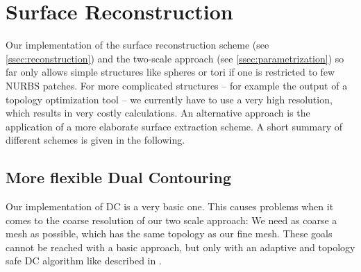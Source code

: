 \chapter{Surface Reconstruction}
\label{appx:AltSurfRecon}
Our implementation of the surface reconstruction scheme (see \autoref{ssec:reconstruction}) and the two-scale approach (see \autoref{ssec:parametrization}) so far only allows simple structures like spheres or tori if one is restricted to few NURBS patches. For more complicated structures -- for example the output of a topology optimization tool -- we currently have to use a very high resolution, which results in very costly calculations. An alternative approach is the application of a more elaborate surface extraction scheme. A short summary of different schemes is given in the following.

\section{More flexible Dual Contouring}
Our implementation of \ac{DC} is a very basic one. This causes problems when it comes to the coarse resolution of our two scale approach: We need as coarse a mesh as possible, which has the same topology as our fine mesh. These goals cannot be reached with a basic approach, but only with an adaptive and topology safe \ac{DC} algorithm like described in \cite{Hermite2002}.

